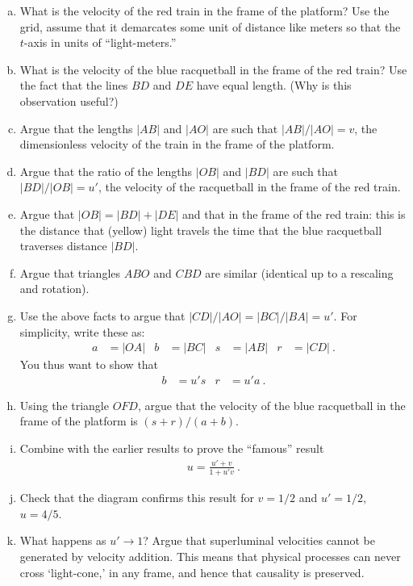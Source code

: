 \documentclass[12pt]{article}
\numberwithin{equation}{section}    %
\begin{document}
\begin{enumerate}[(a)]
	\item What is the velocity of the red train in the frame of the platform? Use the grid, assume that it demarcates some unit of distance like meters so that the $t$-axis in units of ``light-meters.''
	\item What is the velocity of the blue racquetball in the frame of the red train? Use the fact that the lines $BD$ and $DE$ have equal length. (Why is this observation useful?)
	\item Argue that the lengths $|AB|$ and $|AO|$ are such that $|AB|/|AO| = v$, the dimensionless velocity of the train in the frame of the platform.
	\item Argue that the ratio of the lengths $|OB|$ and $|BD|$ are such that $|BD|/|OB| = u'$, the velocity of the racquetball in the frame of the red train.
	\item Argue that $|OB|=|BD|+|DE|$ and that in the frame of the red train: this is the distance that (yellow) light travels the time that the blue racquetball traverses distance $|BD|$.
	\item Argue that triangles $ABO$ and $CBD$ are similar (identical up to a rescaling and rotation). 
	\item Use the above facts to argue that  $|CD|/|AO| = |BC|/|BA| = u'$. For simplicity, write these as: 
	\begin{align}
		a &= |OA| & 
		b &= |BC| &
		s & = |AB| &
		r &= |CD| \ .
	\end{align}
	You thus want to show that
	\begin{align}
		b &= u's & r &= u'a \ .
	\end{align}
	\item Using the triangle $OFD$, argue that the velocity of the blue racquetball in the frame of the platform is $(s+r)/(a+b)$.
	\item Combine with the earlier results to prove the ``famous'' result
	\begin{align}
		u = \frac{u'+v}{1+u'v} \ .
	\end{align}
	\item Check that the diagram confirms this result for $v = 1/2$ and $u' = 1/2$, $u  = 4/5$.
	\item What happens as $u' \to 1$? Argue that superluminal velocities cannot be generated by velocity addition. This means that physical processes can never cross `light-cone,' in any frame, and hence that causality is preserved.
\end{enumerate}
\end{document}
